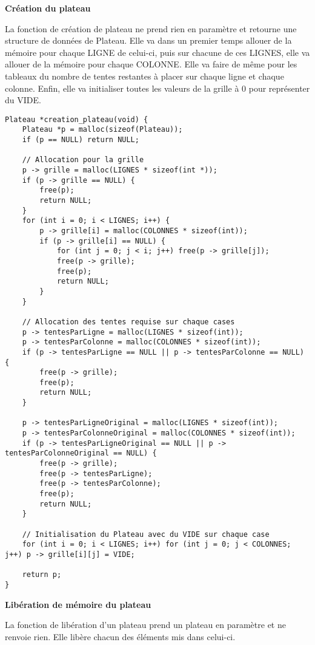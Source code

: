 \documentclass{article}
\begin{document}
\textbf{Création du plateau}

    La fonction de création de plateau ne prend rien en paramètre et retourne une structure de données de Plateau. Elle va dans un premier temps allouer de la mémoire pour chaque LIGNE de celui-ci, puis sur chacune de ces LIGNES, elle va allouer de la mémoire pour chaque COLONNE. Elle va faire de même pour les tableaux du nombre de tentes restantes à placer sur chaque ligne et chaque colonne. Enfin, elle va initialiser toutes les valeurs de la grille à 0 pour représenter du VIDE.
\begin{lstlisting}[style=Cstyle]
Plateau *creation_plateau(void) {
    Plateau *p = malloc(sizeof(Plateau));
    if (p == NULL) return NULL;

    // Allocation pour la grille
    p -> grille = malloc(LIGNES * sizeof(int *));
    if (p -> grille == NULL) {
        free(p);
        return NULL;
    }
    for (int i = 0; i < LIGNES; i++) {
        p -> grille[i] = malloc(COLONNES * sizeof(int));
        if (p -> grille[i] == NULL) {
            for (int j = 0; j < i; j++) free(p -> grille[j]);
            free(p -> grille);
            free(p);
            return NULL;
        }
    }

    // Allocation des tentes requise sur chaque cases
    p -> tentesParLigne = malloc(LIGNES * sizeof(int));
    p -> tentesParColonne = malloc(COLONNES * sizeof(int));
    if (p -> tentesParLigne == NULL || p -> tentesParColonne == NULL) {
        free(p -> grille);
        free(p);
        return NULL;
    }

    p -> tentesParLigneOriginal = malloc(LIGNES * sizeof(int));
    p -> tentesParColonneOriginal = malloc(COLONNES * sizeof(int));
    if (p -> tentesParLigneOriginal == NULL || p -> tentesParColonneOriginal == NULL) {
        free(p -> grille);
        free(p -> tentesParLigne);
        free(p -> tentesParColonne);
        free(p);
        return NULL;
    }

    // Initialisation du Plateau avec du VIDE sur chaque case
    for (int i = 0; i < LIGNES; i++) for (int j = 0; j < COLONNES; j++) p -> grille[i][j] = VIDE;

    return p;
}
\end{lstlisting}

\textbf{Libération de mémoire du plateau}

La fonction de libération d'un plateau prend un plateau en paramètre et ne renvoie rien. Elle libère chacun des éléments mis dans celui-ci.
\end{document}
